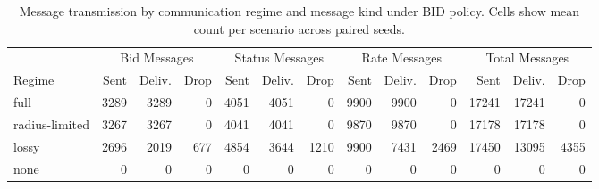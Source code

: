 \begin{table}[t]
\centering\scriptsize
\setlength{\tabcolsep}{2.5pt}
\caption{Message transmission by communication regime and message kind under BID policy. Cells show mean count per scenario across paired seeds.}
\label{tab:messages}
\begin{tabular}{lrrrrrrrrrrrr}
\toprule
& \multicolumn{3}{c}{Bid Messages} & \multicolumn{3}{c}{Status Messages} & \multicolumn{3}{c}{Rate Messages} & \multicolumn{3}{c}{Total Messages} \\
\cmidrule(lr){2-4} \cmidrule(lr){5-7} \cmidrule(lr){8-10} \cmidrule(lr){11-13}
Regime & Sent & Deliv. & Drop & Sent & Deliv. & Drop & Sent & Deliv. & Drop & Sent & Deliv. & Drop \\
\midrule
full & 3289 & 3289 & 0 & 4051 & 4051 & 0 & 9900 & 9900 & 0 & 17241 & 17241 & 0 \\
radius-limited & 3267 & 3267 & 0 & 4041 & 4041 & 0 & 9870 & 9870 & 0 & 17178 & 17178 & 0 \\
lossy & 2696 & 2019 & 677 & 4854 & 3644 & 1210 & 9900 & 7431 & 2469 & 17450 & 13095 & 4355 \\
none & 0 & 0 & 0 & 0 & 0 & 0 & 0 & 0 & 0 & 0 & 0 & 0 \\
\bottomrule
\end{tabular}
\end{table}
